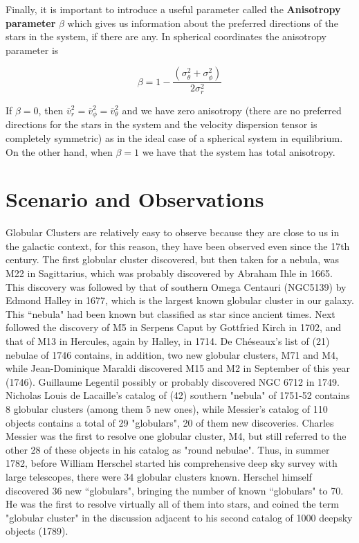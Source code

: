 Finally, it is important to introduce a useful parameter called the \textbf{Anisotropy parameter} $\beta$ which gives us information about the preferred directions of the stars in the system, if there are any. In spherical coordinates the anisotropy parameter is

\begin{equation}
\beta=1-\frac{\left(\sigma_{\theta}^{2}+\sigma_{\phi}^{2}\right)}{2\sigma_{r}^{2}}
\end{equation}

If $\beta=0$, then $\overline{v}_{r}^{2}=\overline{v}_{\phi}^{2}=\overline{v}_{\theta}^{2}$ and we have zero anisotropy (there are no preferred directions for the stars in the system and the velocity dispersion tensor is completely symmetric) as in the ideal case of a spherical system in equilibrium. On the other hand, when $\beta=1$ we have that the system has total anisotropy.

\section{Scenario and Observations}

Globular Clusters are relatively easy to observe because they are close to us in the galactic context, for this reason, they have been observed even since the 17th century. The first globular cluster discovered, but then taken for a nebula, was M22 in Sagittarius, which was probably discovered by Abraham Ihle in 1665. This discovery was followed by that of southern Omega Centauri (NGC5139) by Edmond Halley in 1677, which is the largest known globular cluster in our galaxy. This ``nebula" had been known but classified as star since ancient times. Next followed the discovery of M5 in Serpens Caput by Gottfried Kirch in 1702, and that of M13 in Hercules, again by Halley, in 1714. De Chéseaux's list of (21) nebulae of 1746 contains, in addition, two new globular clusters, M71 and M4, while Jean-Dominique Maraldi discovered M15 and M2 in September of this year (1746). Guillaume Legentil possibly or probably discovered NGC 6712 in 1749. Nicholas Louis de Lacaille's catalog of (42) southern "nebula" of 1751-52 contains 8 globular clusters (among them 5 new ones), while Messier's catalog of 110 objects contains a total of 29 "globulars", 20 of them new discoveries. Charles Messier was the first to resolve one globular cluster, M4, but still referred to the other 28 of these objects in his catalog as "round nebulae". Thus, in summer 1782, before William Herschel started his comprehensive deep sky survey with large telescopes, there were 34 globular clusters known. Herschel himself discovered 36 new ``globulars", bringing the number of known ``globulars" to 70. He was the first to resolve virtually all of them into stars, and coined the term "globular cluster" in the discussion adjacent to his second catalog of 1000 deepsky objects (1789).

